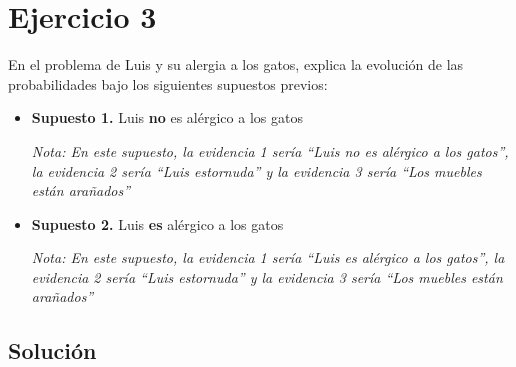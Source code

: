 \documentclass{article}
\begin{document}
\begin{enumerate}[label=\alph*)]
\begin{center}
\end{center}
\end{enumerate}

\section{\textbf{Ejercicio 3}}

En el problema de Luis y su alergia a los gatos, explica la evolución de las
probabilidades bajo los siguientes supuestos previos:

\begin{itemize}[label={}]
  \item \textbf{Supuesto 1.} Luis \textbf{no} es alérgico a los gatos
  
  \textit{Nota: En este supuesto, la evidencia 1 sería “Luis no es alérgico a los gatos”, la evidencia 2 sería “Luis estornuda” y la evidencia 3 sería “Los muebles están arañados”}
  \item \textbf{Supuesto 2.} Luis \textbf{es} alérgico a los gatos
  
  \textit{Nota: En este supuesto, la evidencia 1 sería “Luis es alérgico a los gatos”, la evidencia 2 sería “Luis estornuda” y la evidencia 3 sería “Los muebles están arañados”}
\end{itemize}

\newpage

\subsection{Solución}
\end{document}
